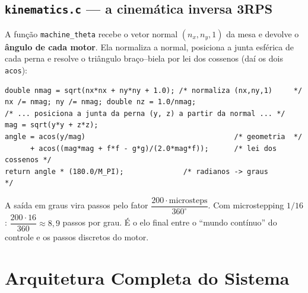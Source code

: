 \section{\texttt{kinematics.c} --- a cinem\'atica inversa 3RPS}
A fun\c{c}\~ao \texttt{machine\_theta} recebe o vetor normal $(n_x,n_y,1)$ da mesa e
devolve o \textbf{\^angulo de cada motor}. Ela normaliza a normal, posiciona a junta
esf\'erica de cada perna e resolve o tri\^angulo bra\c{c}o--biela por lei dos
cossenos (da\'i os dois \texttt{acos}):
\begin{lstlisting}[caption={Esqueleto de \texttt{machine\_theta} (perna A).},label={lst:kin}]
double nmag = sqrt(nx*nx + ny*ny + 1.0); /* normaliza (nx,ny,1)     */
nx /= nmag; ny /= nmag; double nz = 1.0/nmag;
/* ... posiciona a junta da perna (y, z) a partir da normal ... */
mag = sqrt(y*y + z*z);
angle = acos(y/mag)                                   /* geometria  */
      + acos((mag*mag + f*f - g*g)/(2.0*mag*f));      /* lei dos cossenos */
return angle * (180.0/M_PI);              /* radianos -> graus       */
\end{lstlisting}
\begin{projeto}
A sa\'ida em graus vira passos pelo fator
$\dfrac{200\cdot\text{microsteps}}{360^\circ}$. Com microstepping $1/16$:
$\dfrac{200\cdot16}{360}\approx8{,}9$ passos por grau. \'E o elo final entre o
``mundo cont\'inuo'' do controle e os passos discretos do motor.
\end{projeto}

\chapter{Arquitetura Completa do Sistema}\label{cap:arq}

